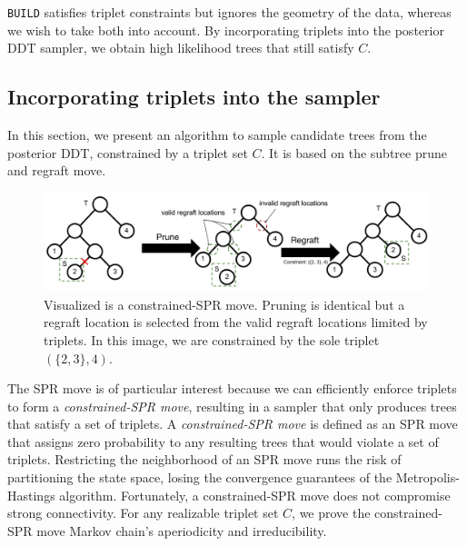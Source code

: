 \texttt{BUILD} satisfies triplet constraints but ignores 
the geometry of the data, whereas we wish to take both into
account. By incorporating triplets into the posterior DDT 
sampler, we obtain high likelihood trees that still satisfy $C$.


\subsection{Incorporating triplets into the sampler}

In this section, we present an algorithm
to sample candidate trees 
from the posterior DDT, constrained
by a triplet set $C$.
It is based on the subtree prune and regraft move.

\begin{figure}[htp!]
    \centering
    \includegraphics[width=\textwidth]{img/ConstrainedSPRMove}
    \caption{
            Visualized is a constrained-SPR move.
            Pruning is identical  but
            a regraft location is selected from the valid regraft locations
            limited by triplets.
            In this image, we are constrained by the sole triplet $(\{2, 3\}, 4)$.
            }
    \label{fig:constrainedsprmove}
\end{figure}

The SPR move is of particular interest
because we can efficiently
enforce triplets to form a \emph{constrained-SPR move},
resulting in a sampler
that only produces trees that satisfy a set of triplets.
A \emph{constrained-SPR move} is defined as
an SPR move that assigns zero probability to
any resulting trees that would violate a set of triplets.
Restricting the neighborhood of an SPR move
runs the risk of partitioning the state space,
losing the convergence
guarantees of the Metropolis-Hastings algorithm.
Fortunately, a constrained-SPR move does not compromise
strong connectivity.
For any realizable triplet set $C$,
we prove 
the constrained-SPR move Markov chain's aperiodicity and irreducibility.

